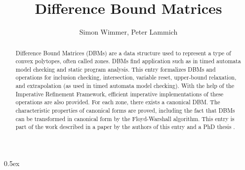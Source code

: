 \documentclass[11pt,a4paper]{article}
\begin{document}
\title{Difference Bound Matrices}
\author{Simon Wimmer, Peter Lammich}

\maketitle
\begin{abstract}
  Difference Bound Matrices (DBMs) \cite{dill} are a data structure used to represent a type of
  convex polytopes, often called zones.
  DBMs find application such as in timed automata model checking and static program analysis.
  This entry formalizes DBMs and operations for inclusion checking, intersection, variable reset,
  upper-bound relaxation, and extrapolation (as used in timed automata model checking).
  With the help of the Imperative Refinement Framework, efficient imperative implementations
  of these operations are also provided.
  For each zone, there exists a canonical DBM. The characteristic properties of canonical forms are
  proved, including the fact that DBMs can be transformed in canonical form by the Floyd-Warshall algorithm.
  This entry is part of the work described in a paper by the authors of this entry
  \cite{DBLP:conf/tacas/WimmerL18} and a PhD thesis \cite{DBLP:phd/dnb/Wimmer20}.
\end{abstract}

\tableofcontents
\newpage

\parindent 0pt\parskip 0.5ex





\end{document}
